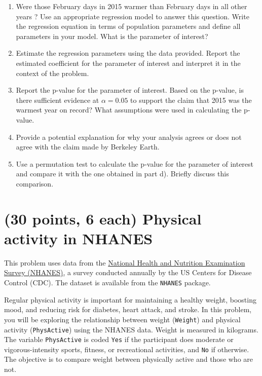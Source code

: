 \documentclass[letterpaper,12pt,twoside,]{pinp}
\begin{document}
\begin{enumerate}
\def\labelenumi{\alph{enumi})}
\setcounter{enumi}{1}
\item
  Were those February days in 2015 warmer than February days in all
  other years ? Use an appropriate regression model to answer this
  question. Write the regression equation in terms of population
  parameters and define all parameters in your model. What is the
  parameter of interest?
\item
  Estimate the regression parameters using the data provided. Report the
  estimated coefficient for the parameter of interest and interpret it
  in the context of the problem.
\item
  Report the p-value for the parameter of interest. Based on the
  p-value, is there sufficient evidence at \(\alpha = 0.05\) to support
  the claim that 2015 was the warmest year on record? What assumptions
  were used in calculating the p-value.
\item
  Provide a potential explanation for why your analysis agrees or does
  not agree with the claim made by Berkeley Earth.
\item
  Use a permutation test to calculate the p-value for the parameter of
  interest and compare it with the one obtained in part d). Briefly
  discuss this comparison.
\end{enumerate}

\hypertarget{points-6-each-physical-activity-in-nhanes}{%
\section{(30 points, 6 each) Physical activity in
NHANES}\label{points-6-each-physical-activity-in-nhanes}}

This problem uses data from the
\href{https://cran.r-project.org/web/packages/NHANES/NHANES.pdf}{National
Health and Nutrition Examination Survey (NHANES)}, a survey conducted
annually by the US Centers for Disease Control (CDC). The dataset is
available from the \texttt{NHANES} package.

Regular physical activity is important for maintaining a healthy weight,
boosting mood, and reducing risk for diabetes, heart attack, and stroke.
In this problem, you will be exploring the relationship between weight
(\texttt{Weight}) and physical activity (\texttt{PhysActive}) using the
NHANES data. Weight is measured in kilograms. The variable
\texttt{PhysActive} is coded \texttt{Yes} if the participant does
moderate or vigorous-intensity sports, fitness, or recreational
activities, and \texttt{No} if otherwise. The objective is to compare
weight between physically active and those who are not.
\end{document}
